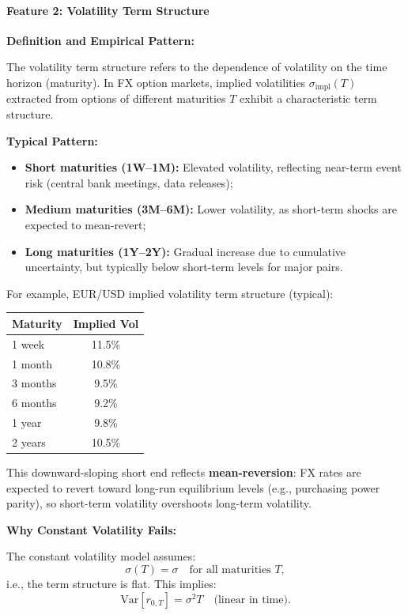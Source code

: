 \paragraph{Feature 2: Volatility Term Structure}

\textbf{Definition and Empirical Pattern:}

The volatility term structure refers to the dependence of volatility on the time horizon (maturity). In FX option markets, implied volatilities $\sigma_{\text{impl}}(T)$ extracted from options of different maturities $T$ exhibit a characteristic term structure.

\textbf{Typical Pattern:}

\begin{itemize}
	\item \textbf{Short maturities (1W--1M):} Elevated volatility, reflecting near-term event risk (central bank meetings, data releases);
	\item \textbf{Medium maturities (3M--6M):} Lower volatility, as short-term shocks are expected to mean-revert;
	\item \textbf{Long maturities (1Y--2Y):} Gradual increase due to cumulative uncertainty, but typically below short-term levels for major pairs.
\end{itemize}

For example, EUR/USD implied volatility term structure (typical):
\begin{center}
	\begin{tabular}{|l|c|}
		\hline
		\textbf{Maturity} & \textbf{Implied Vol} \\
		\hline
		1 week & 11.5\% \\
		1 month & 10.8\% \\
		3 months & 9.5\% \\
		6 months & 9.2\% \\
		1 year & 9.8\% \\
		2 years & 10.5\% \\
		\hline
	\end{tabular}
\end{center}

This downward-sloping short end reflects \textbf{mean-reversion}: FX rates are expected to revert toward long-run equilibrium levels (e.g., purchasing power parity), so short-term volatility overshoots long-term volatility.

\textbf{Why Constant Volatility Fails:}

The constant volatility model assumes:
\begin{equation}
	\sigma(T) = \sigma \quad \text{for all maturities } T,
\end{equation}
i.e., the term structure is flat. This implies:
\begin{equation}
	\text{Var}[r_{0,T}] = \sigma^2 T \quad \text{(linear in time)}.
\end{equation}

